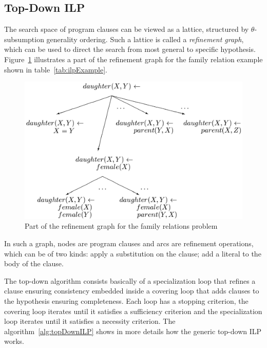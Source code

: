 \subsection{Top-Down ILP}

The search space of program clauses can be viewed as a lattice, structured by $\theta$-subsumption generality
ordering. Such a lattice is called a \emph{refinement graph}, which can be used to direct the search from most general
to specific hypothesis. Figure~\ref{fig:refinementGraph} illustrates a part of the refinement graph for the
family relation example shown in table~\ref{tab:ilpExample}.

\begin{figure}[h!]
\label{fig:refinementGraph}
\begin{center}
  \includegraphics[width=0.7\linewidth]{./Figures/refinementGraph.png}
\end{center}
\caption{Part of the refinement graph for the family relations problem}
\end{figure}

In such a graph, nodes are program clauses and arcs are refinement operations, which can be of two kinds: apply
a substitution on the clause; add a literal to the body of the clause.

The top-down algorithm consists basically of a specialization loop that refines a clause ensuring consistency
embedded inside a covering loop that adds clauses to the hypothesis ensuring completeness. Each loop has a stopping
criterion, the covering loop iterates until it satisfies a sufficiency criterion and the specialization loop iterates
until it satisfies a necessity criterion. The algorithm~\ref{alg:topDownILP} shows in more details how the generic
top-down ILP works.

